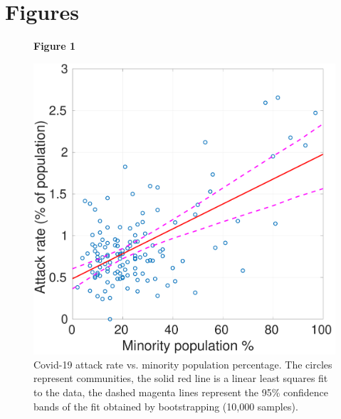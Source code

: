 \documentclass[twoside,12pt,onecolumn]{article}
\begin{document}
\newpage




\newpage
\section*{Figures}
\begin{figure}[h]
  \begin{center}
  \caption{Covid-19 attack rate vs. minority population percentage. The circles represent communities, the solid red line is a linear least squares fit to the data, the dashed magenta lines represent the 95\% confidence bands of the fit obtained by bootstrapping (10,000 samples).}

  \label{fig:AttackRateVsMinority}  	
  
  \textbf{Figure 1}

  \includegraphics[width=0.6\linewidth]{AttackRateVsMinorityPopulation.pdf}
  \end{center}


\end{figure}
\clearpage
\end{document}
